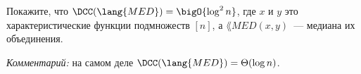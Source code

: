 Покажите, что $\DCC(\lang{MED}) = \bigO{\log^2 n}$, где $x$ и $y$ это характеристические функции подмножеств
$[n]$, а $\lang{MED}(x, y)$~--- медиана их объединения.

\textit{Комментарий:} на самом деле $\DCC(\lang{MED}) = \Theta(\log n)$.
